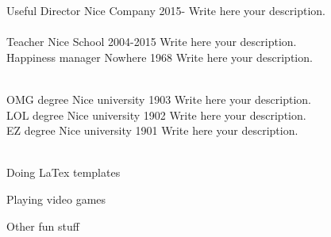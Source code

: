 \documentclass[11pt]{spidercv}
\begin{document}
    \begin{MainPart}

    \Experience
        {\ColorHighlight}
		{Useful Director}
		{Nice Company}
        {2015-\faUndo}
        {   
            Write here your description.\\
            \lorem\\
            \lorem
        }
    \Experience
        {\ColorHighlight}
		{Teacher}
		{Nice School}
        {2004-2015}
        {   
            Write here your description.\\
            \lorem
        }
    \Experience
        {\ColorHighlight}
		{Happiness manager}
		{Nowhere}
        {1968}
        {   
            Write here your description.\\
            \lorem\\
            \lorem
        }


    
    \Experience
        {\ColorHighlight}
		{OMG degree}
		{Nice university}
        {1903}
        {   
            Write here your description.\\
            \lorem
        }
    \Experience
        {\ColorHighlight}
		{LOL degree}
		{Nice university}
        {1902}
        {   
            Write here your description.\\
            \lorem
        }
    \Experience
        {\ColorHighlight}
		{EZ degree}
		{Nice university}
        {1901}
        {   
            Write here your description.\\
            \lorem\\
            \lorem
        }


    \vspace*{0.5cm}
    \begin{DoubleColumns}
        \begin{ItemList}{\ColorHighlight}
            \item [] Doing LaTex templates
            \item [] Playing video games
        \end{ItemList}
        \nextcolumn
        \begin{ItemList}{\ColorHighlight}
            \item [] Other fun stuff
        \end{ItemList}
    \end{DoubleColumns}

    \end{MainPart}

    
\end{document}
